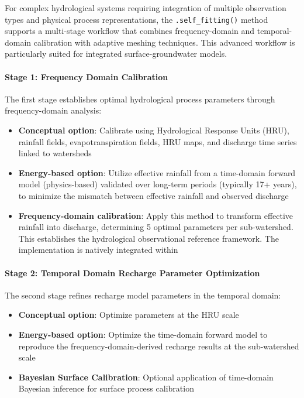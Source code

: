 For complex hydrological systems requiring integration of multiple observation types and physical process representations, the \texttt{.self\_fitting()} method supports a multi-stage workflow that combines frequency-domain and temporal-domain calibration with adaptive meshing techniques. This advanced workflow is particularly suited for integrated surface-groundwater models.

\paragraph{Stage 1: Frequency Domain Calibration}

The first stage establishes optimal hydrological process parameters through frequency-domain analysis:

\begin{itemize}
\item \textbf{Conceptual option}: Calibrate using Hydrological Response Units (HRU), rainfall fields, evapotranspiration fields, HRU maps, and discharge time series linked to watersheds

\item \textbf{Energy-based option}: Utilize effective rainfall from a time-domain forward model (physics-based) validated over long-term periods (typically 17+ years), to minimize the mismatch between effective rainfall and observed discharge

\item \textbf{Frequency-domain calibration}: Apply this method to transform effective rainfall into discharge, determining 5 optimal parameters per sub-watershed. This establishes the hydrological observational reference framework. The implementation is natively integrated within \hydrot
\end{itemize}

\paragraph{Stage 2: Temporal Domain Recharge Parameter Optimization}

The second stage refines recharge model parameters in the temporal domain:

\begin{itemize}
\item \textbf{Conceptual option}: Optimize parameters at the HRU scale

\item \textbf{Energy-based option}: Optimize the time-domain forward model to reproduce the frequency-domain-derived recharge results at the sub-watershed scale

\item \textbf{Bayesian Surface Calibration}: Optional application of time-domain Bayesian inference for surface process calibration
\end{itemize}

